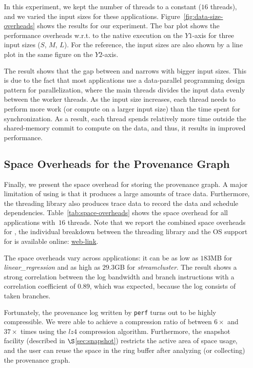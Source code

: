 In this experiment, we kept the number of threads to a constant  ($16$ threads), and we varied the input sizes for these applications.  Figure~\ref{fig:data-size-overheads} shows the results for our experiment. The bar plot shows the performance overheads w.r.t. to the native \pthreads execution on the $Y1$-axis for three input sizes ($S$, $M$, $L$). For the reference, the input sizes are also shown by a line plot in the same figure on the $Y2$-axis. 

The result shows that the gap between \pthreads and \projecttitle narrows with bigger input sizes. This is due to the fact that most applications use a data-parallel programming design pattern for parallelization, where the main threads divides the input data evenly between the worker threads. As the input size increases, each thread needs to perform more work (or compute on a larger input size) than the time spent for synchronization. As a result, each thread spends relatively more time outside the shared-memory commit to compute on the data, and thus, it results in improved performance.
 



\subsection{Space Overheads for the Provenance Graph}
\label{subsec:overheads-breakdown}

Finally, we present the space overhead for storing the provenance graph. A major limitation of using \intelpt is that it produces a large amounts of trace data. Furthermore, the threading library also produces trace data to record the data and schedule dependencies.  Table~\ref{tab:space-overheads} shows the space overhead for all applications with~$16$ threads. Note that we report the combined space overheads for \projecttitle, the individual breakdown between the threading library and the OS support for \intelpt is available online:  \href{https://mic92.github.io/inspector/index.html\#measurement_table}{web-link}. 

The space overheads vary across applications: it can be as low as $183$MB for {\em linear\_regression} and as high as $29.3$GB for {\em streamcluster}. The result shows a strong correlation between the log bandwidth and branch instructions with a correlation coefficient of 0.89, which was expected, because the
log consists of taken branches.

Fortunately,  the provenance log written by {\tt perf} turns out to be highly compressible. We
were able to achieve a compression ratio of between $6\times$ and $37\times$ times using the $lz4$ compression algorithm. 
Furthermore, the snapshot facility (described in $\S$\ref{sec:snapshot}) restricts the active area of space usage, and the user can reuse the space in the ring buffer after analyzing (or collecting) the provenance graph.







